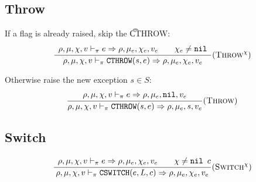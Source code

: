 \subsection{Throw}
If a flag is already raised, skip the \t{CTHROW}:
\[\dfrac{\begin{array}{c}
    \rho,\mu,\chi,v \vdash_\pi e \Rightarrow \rho,\mu_e,\chi_e,v_e \qquad \chi_e\ne\texttt{nil}
\end{array}}{\rho,\mu,\chi,v \vdash_\pi \texttt{CTHROW}(s,e) \Rightarrow \rho,\mu_e,\chi_e,v_e} (\textsc{Throw}^\chi)\]

Otherwise raise the new exception \(s\in S\):
\[\dfrac{\begin{array}{c}
    \rho,\mu,\chi,v \vdash_\pi e \Rightarrow \rho,\mu_e,\texttt{nil},v_e
\end{array}}{\rho,\mu,\chi,v \vdash_\pi \texttt{CTHROW}(s,e) \Rightarrow \rho,\mu_e,s,v_e} (\textsc{Throw})\]

\subsection{Switch}

\[\dfrac{\begin{array}{c}
    \rho,\mu,\chi,v \vdash_\pi e \Rightarrow \rho,\mu_e,\chi_e,v_e \qquad \chi\ne\texttt{nil}
\end{array}{c}}{\rho,\mu,\chi,v \vdash_\pi \texttt{CSWITCH}(e, L, c) \Rightarrow \rho,\mu_e,\chi_e,v_e} (\textsc{Switch}^\chi)\]




